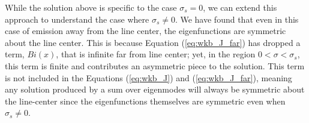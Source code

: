 \documentclass[linenumbers]{aastex63}
\begin{document}
While the solution above is specific to the case $\sigma_s = 0$, we can extend this approach to understand the case where $\sigma_s \neq 0$. We have found that even in this case of emission away from the line center, the eigenfunctions are symmetric about the line center. This is because Equation (\ref{eq:wkb_J_far}) has dropped a term, $Bi(x)$, that is infinite far from line center; yet, in the region $0 < \sigma < \sigma_s$, this term is finite and contributes an asymmetric piece to the solution. This term is not included in the Equations (\ref{eq:wkb_J}) and (\ref{eq:wkb_J_far}), meaning any solution produced by a sum over eigenmodes will always be symmetric about the line-center since the eigenfunctions themselves are symmetric even when $\sigma_s \neq 0$. 

{}

\end{document}
